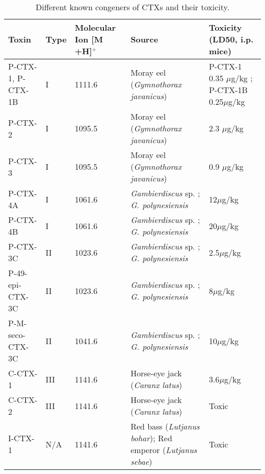 \documentclass[12pt]{article}
\begin{document}
\begin{table}
\caption{Different known congeners of CTXs and their toxicity.}
\label{tbl:CTXTable}
\begin{tabular}{  | p{2cm} | p{1.5cm} | p{2.5cm} | p{4cm} | p{4cm} |}
\hline
\textbf{Toxin} & \textbf{Type} & \textbf{Molecular Ion [M +H]$^{+}$} & \textbf{Source} & \textbf{Toxicity (LD50, i.p. mice)} \\
\hline
P-CTX-1, P-CTX-1B & I & 1111.6 & Moray eel (\emph{Gymnothorax javanicus}) \cite{murata1990structures,lewis1991purification} & P-CTX-1 0.35 $\mu$g/kg \cite{murata1990structures}; P-CTX-1B 0.25$\mu$g/kg \cite{lewis1991purification} \\
\hline
P-CTX-2 & I & 1095.5 \cite{lewis1991purification} & Moray eel (\emph{Gymnothorax javanicus}) \cite{lewis1991purification} & 2.3 $\mu$g/kg \cite{lewis1991purification} \\
\hline
 P-CTX-3 & I & 1095.5 \cite{lewis1991purification} & Moray eel (\emph{Gymnothorax javanicus}) \cite{lewis1991purification} & 0.9 $\mu$g/kg \cite{lewis1991purification} \\
 \hline
 P-CTX-4A & I & 1061.6 \cite{yasumoto2000structural} & \emph{Gambierdiscus} sp. \cite{yasumoto2000structural}; \emph{G. polynesiensis} \cite{chinain2010growth} & 12$\mu$g/kg \cite{chinain2010growth} \\
 \hline
 P-CTX-4B & I & 1061.6 \cite{yasumoto2000structural} & \emph{Gambierdiscus} sp. \cite{yasumoto2000structural}; \emph{G. polynesiensis} \cite{chinain2010growth} & 20$\mu$g/kg \cite{chinain2010growth}\\
 \hline
 P-CTX-3C & II & 1023.6 \cite{satake1993structure} &  \emph{Gambierdiscus} sp. \cite{satake1993structure}; \emph{G. polynesiensis} \cite{chinain2010growth} & 2.5$\mu$g/kg \cite{chinain2010growth}\\
 \hline
 P-49-epi-CTX-3C & II & 1023.6 \cite{chinain2010growth} & \emph{Gambierdiscus} sp. \cite{satake1993structure}; \emph{G. polynesiensis} \cite{chinain2010growth} & 8$\mu$g/kg\cite{chinain2010growth}\\
 \hline
 P-M-seco-CTX-3C & II & 1041.6 \cite{chinain2010growth} &\emph{Gambierdiscus} sp. \cite{satake1993structure}; \emph{G. polynesiensis} \cite{chinain2010growth} & 10$\mu$g/kg \cite{chinain2010growth}\\
 \hline
 C-CTX-1 & III & 1141.6 \cite{vernoux1997isolation,pottier2002characterisation} & Horse-eye jack (\emph{Caranx latus}) \cite{vernoux1997isolation,pottier2002characterisation} & 3.6$\mu$g/kg \cite{vernoux1997isolation}\\
 \hline
 C-CTX-2 & III & 1141.6 \cite{vernoux1997isolation,pottier2002characterisation}& Horse-eye jack (\emph{Caranx latus}) \cite{vernoux1997isolation,pottier2002characterisation} & Toxic \cite{vernoux1997isolation}\\
 \hline
 I-CTX-1 & N/A & 1141.6 \cite{hamilton2002isolation}& Red bass (\emph{Lutjanus bohar}); Red emperor (\emph{Lutjanus sebae}) \cite{hamilton2002isolation} & Toxic \cite{hamilton2002isolation} \\
 \hline
\end{tabular}
\end{table}
\FloatBarrier
\end{document}
